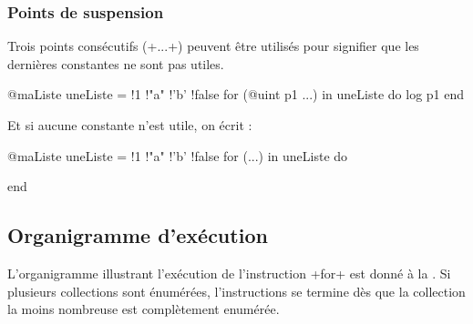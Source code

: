 \subsubsection{Points de suspension}

Trois points consécutifs (\ggs+...+) peuvent être utilisés pour signifier que les dernières constantes ne sont pas utiles.

\begin{galgas}
@maListe uneListe = {!1 !"a" !'b' !false}
for (@uint p1 ...) in uneListe do
  log p1
end
\end{galgas}

Et si aucune constante n'est utile, on écrit :
\begin{galgas}
@maListe uneListe = {!1 !"a" !'b' !false}
for (...) in uneListe do

end
\end{galgas}






\subsection{Organigramme d'exécution}

L'organigramme illustrant l'exécution de l'instruction \ggs+for+ est donné à la . Si plusieurs collections sont énumérées, l'instructions se termine dès que la collection la moins nombreuse est complètement enumérée.

